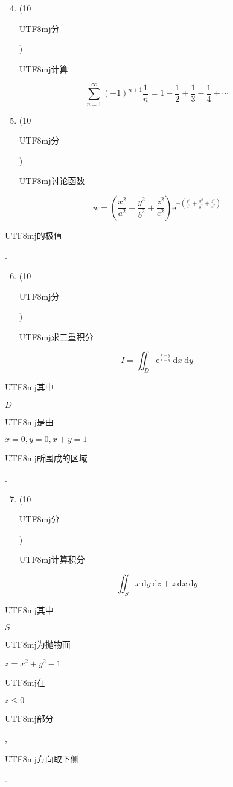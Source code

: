 \documentclass[10pt]{article}
\begin{document}
\begin{enumerate}
  \setcounter{enumi}{3}
  \item (10 \begin{CJK}{UTF8}{mj}分\end{CJK}) \begin{CJK}{UTF8}{mj}计算\end{CJK}
\end{enumerate}
$$
\sum_{n=1}^{\infty}(-1)^{n+1} \frac{1}{n}=1-\frac{1}{2}+\frac{1}{3}-\frac{1}{4}+\cdots
$$

\begin{enumerate}
  \setcounter{enumi}{4}
  \item (10 \begin{CJK}{UTF8}{mj}分\end{CJK}) \begin{CJK}{UTF8}{mj}讨论函数\end{CJK}
\end{enumerate}
$$
w=\left(\frac{x^{2}}{a^{2}}+\frac{y^{2}}{b^{2}}+\frac{z^{2}}{c^{2}}\right) \mathrm{e}^{-\left(\frac{x^{2}}{a^{2}}+\frac{y^{2}}{b^{2}}+\frac{z^{2}}{c^{2}}\right)}
$$
\begin{CJK}{UTF8}{mj}的极值\end{CJK}.

\begin{enumerate}
  \setcounter{enumi}{5}
  \item (10 \begin{CJK}{UTF8}{mj}分\end{CJK}) \begin{CJK}{UTF8}{mj}求二重积分\end{CJK}
\end{enumerate}
$$
I=\iint_{D} \mathrm{e}^{\frac{x-y}{x+y}} \mathrm{~d} x \mathrm{~d} y
$$
\begin{CJK}{UTF8}{mj}其中\end{CJK} $D$ \begin{CJK}{UTF8}{mj}是由\end{CJK} $x=0, y=0, x+y=1$ \begin{CJK}{UTF8}{mj}所围成的区域\end{CJK}.

\begin{enumerate}
  \setcounter{enumi}{6}
  \item (10 \begin{CJK}{UTF8}{mj}分\end{CJK}) \begin{CJK}{UTF8}{mj}计算积分\end{CJK}
\end{enumerate}
$$
\iint_{S} x \mathrm{~d} y \mathrm{~d} z+z \mathrm{~d} x \mathrm{~d} y
$$
\begin{CJK}{UTF8}{mj}其中\end{CJK} $S$ \begin{CJK}{UTF8}{mj}为抛物面\end{CJK} $z=x^{2}+y^{2}-1$ \begin{CJK}{UTF8}{mj}在\end{CJK} $z \leq 0$ \begin{CJK}{UTF8}{mj}部分\end{CJK}, \begin{CJK}{UTF8}{mj}方向取下侧\end{CJK}.
\end{document}
